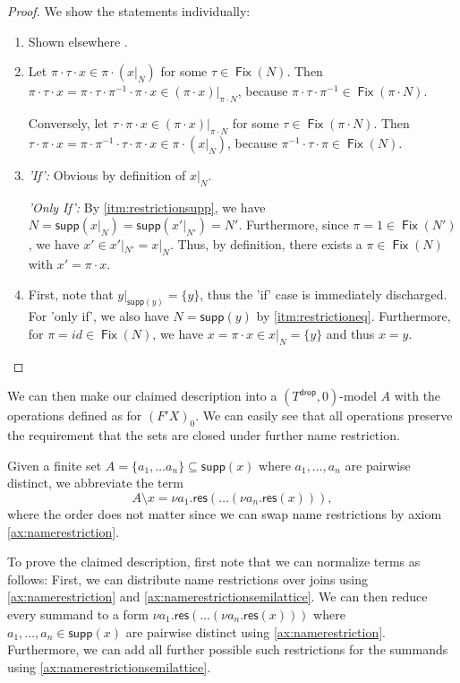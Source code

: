 \documentclass[a4paper,UKenglish,cleveref,thm-restate,numberwithinsect,final]{lipics-v2021}
\newcommand{\res}{\mathsf{res}}
\newcommand{\drop}{\mathsf{drop}}
\newcommand{\supp}{\mathsf{supp}}
\newcommand{\Fix}{\mathop{\mathsf{Fix}}}
\theoremstyle{plain}
\newcommand{\id}{\mathit{id}}
\numberwithin{equation}{section}
\newcommand{\+}[1]{\mathcal{#1}\xspace}
\theoremstyle{definition}
\begin{document}
\begin{proof}
  We show the statements individually:
  \begin{enumerate}
    \item Shown elsewhere \cite[Lemma 5.8]{SchroderEA17}.
    \item
      Let $\pi \cdot \tau \cdot x \in \pi \cdot (x|_N)$ for some $\tau \in \Fix(N)$.
      Then $\pi \cdot \tau \cdot x = \pi \cdot \tau \cdot \pi^{-1} \cdot \pi \cdot x \in (\pi \cdot x)|_{\pi \cdot N}$, because $\pi \cdot \tau \cdot \pi^{-1} \in \Fix(\pi \cdot N)$.

      Conversely, let $\tau \cdot \pi \cdot x \in (\pi \cdot x)|_{\pi \cdot N}$ for some $\tau \in \Fix(\pi \cdot N)$.
      Then $\tau \cdot \pi \cdot x = \pi \cdot \pi^{-1} \cdot \tau \cdot \pi \cdot x \in \pi \cdot (x|_N)$, because $\pi^{-1} \cdot \tau \cdot \pi \in \Fix(N)$.
    \item
      \emph{'If':} Obvious by definition of $x|_N$.

      \emph{'Only If':}
      By \eqref{itm:restrictionsupp}, we have $N = \supp(x|_N) = \supp(x'|_{N'}) = N'$.
      Furthermore, since $\pi = 1 \in \Fix(N')$, we have $x' \in x'|_{N'} = x|_N$.
      Thus, by definition, there exists a $\pi \in \Fix(N)$ with $x' = \pi \cdot x$.
    \item
      First, note that $y|_{\supp(y)} = \{y\}$, thus the 'if' case is immediately discharged.
      For 'only if', we also have $N = \supp(y)$ by \eqref{itm:restrictioneq}.
      Furthermore, for $\pi = \id \in \Fix(N)$, we have $x = \pi \cdot x \in x|_N = \{y\}$ and thus $x = y$.
  \end{enumerate}
\end{proof}

We can then make our claimed description into a $(T^\drop, 0)$-model $A$ with the operations defined as for $(F'X)_0$.
We can easily see that all operations preserve the requirement that the sets are closed under further name restriction.

Given a finite set $A = \{a_1, \dots a_n\} \subseteq \supp(x)$ where $a_1, \dots, a_n$ are pairwise distinct, we abbreviate the term
\begin{equation*}
  A \setminus x = \nu a_1.\res(\dots(\nu a_n.\res(x))),
\end{equation*}
where the order does not matter since we can swap name restrictions by axiom \eqref{ax:namerestriction}.

To prove the claimed description, first note that we can normalize terms as follows:
First, we can distribute name restrictions over joins using \eqref{ax:namerestriction} and \eqref{ax:namerestrictionsemilattice}.
We can then reduce every summand to a form $\nu a_1.\res(\dots (\nu a_n.\res(x)))$ where $a_1, \dots, a_n \in \supp(x)$ are pairwise distinct using \eqref{ax:namerestriction}.
Furthermore, we can add all further possible such restrictions for the summands using \eqref{ax:namerestrictionsemilattice}.
\end{document}
